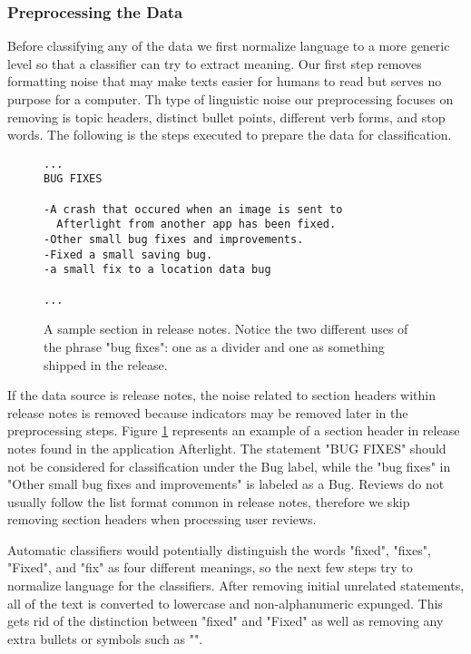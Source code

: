 \documentclass{acm_proc_article-sp}
\begin{document}
\subsubsection{Preprocessing the Data}

Before classifying any of the data we first normalize language to a more generic level so that a classifier can try to extract meaning.
Our first step removes formatting noise that may make texts easier for humans to read but serves no purpose for a computer. 
Th type of linguistic noise our preprocessing focuses on removing is topic headers, distinct bullet points, different verb forms, and stop words. 
The following is the steps executed to prepare the data for classification.

\begin{figure}
\begin{verbatim}
...
BUG FIXES

-A crash that occured when an image is sent to 
  Afterlight from another app has been fixed.
-Other small bug fixes and improvements.
-Fixed a small saving bug.
-a small fix to a location data bug

...
\end{verbatim}
\caption{A sample section in release notes. Notice the two different uses of the phrase "bug fixes": one as a divider and one as something shipped in the release.}
\label{figbugfix}
\end{figure}

If the data source is release notes, the noise related to section headers within release notes is removed because indicators may be removed later in the preprocessing steps.
Figure \ref{figbugfix} represents an example of a section header in release notes found in the application Afterlight. 
The statement "BUG FIXES" should not be considered for classification under the Bug label, while the "bug fixes" in  "Other small bug fixes and improvements" is labeled as a Bug. 
Reviews do not usually follow the list format common in release notes, therefore we skip removing section headers when processing user reviews.


Automatic classifiers would potentially distinguish the words "fixed", "fixes", "Fixed", and "fix" as four different meanings, so the next few steps try to normalize language for the classifiers.
After removing initial unrelated statements, all of the text is converted to lowercase and non-alphanumeric expunged.
This gets rid of the distinction between "fixed" and "Fixed" as well as removing any extra bullets or symbols such as "".
\end{document}
